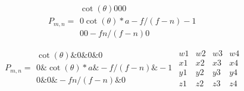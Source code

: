 \documentclass{article}
\begin{document}
\[ P_{m,n} = \begin{matrix} \cot(\theta) 0 0 0 \\ 0 \cot(\theta) * a -f/(f-n) -1 \\ 0 0 -fn/(f-n) 0 \end{matrix} \]
\pagebreak

\[ P_{m,n} = \begin{matrix} \cot(\theta) \& 0 \& 0 \& 0 \\ 0 \& \cot(\theta) * a \& -f/(f-n) \& -1 \\ 0 \& 0 \& -fn/(f-n) \& 0 \end{matrix} \begin{array}{cccc} w1 & w2 & w3 & w4 \\ x1 & x2 & x3 & x4 \\ y1 & y2 & y3 & y4 \\ z1 & z2 & z3 & z4 \end{array} \]
\pagebreak
\end{document}
